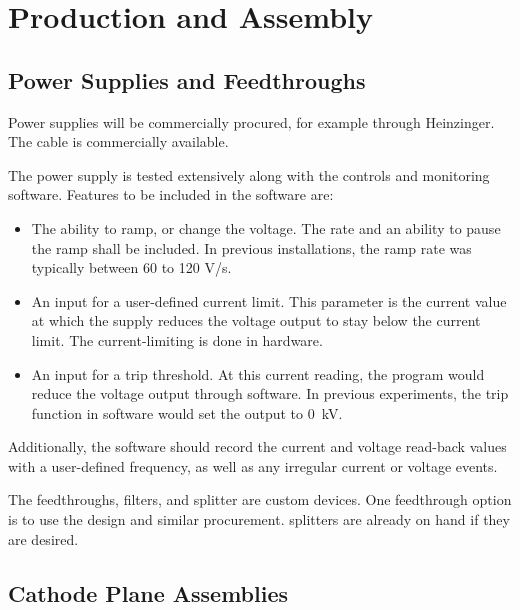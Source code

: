 \section{Production and Assembly}
\label{sec:fdsp-hv-prod-assy}

\subsection{Power Supplies and Feedthroughs}
\label{sec:fdsp-hv-supplies-feedthroughs}

Power supplies will be commercially procured, for example through Heinzinger. The  cable is commercially available.

The power supply is tested extensively along with the controls and monitoring software.  Features to be included in the software are:
\begin{itemize}
\item The ability to ramp, or change the voltage.  The rate and an ability to pause the ramp shall be included.  In previous installations, the ramp rate was typically between 60 to 120 V/s.
\item An input for a user-defined current limit.  This parameter is the current value at which the supply reduces the voltage output to stay below the current limit.  The current-limiting is done in hardware.
\item An input for a trip threshold.  At this current reading, the program would reduce the voltage output through software.  In previous experiments, the trip function in software would set the output to \SI{0}{kV}.
\end{itemize}
\noindent Additionally, the software should record the current and voltage read-back values with a user-defined frequency, as well as any irregular current or voltage events.

The  feedthroughs, filters, and splitter are custom devices.  One feedthrough option is to use the  design and similar procurement.   splitters are already on hand if they are desired.

\subsection{Cathode Plane Assemblies}
\label{sec:fdsp-hv-prod-cpa}

